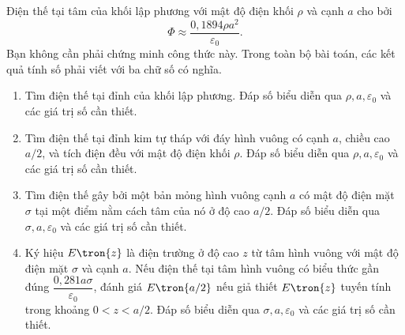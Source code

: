 \begin{vd}%
Điện thế tại tâm của khối lập phương với mật độ điện khối $\rho$ và cạnh $a$ cho bởi
$$\Phi  \approx \dfrac{{0,1894\rho {a^2}}}{{{\varepsilon_0}}}.$$
Bạn không cần phải chứng minh công thức này. Trong toàn bộ bài toán, các kết quả tính số phải viết với ba chữ số có nghĩa.
\begin{enumerate}[1)]
    \item Tìm điện thế tại đỉnh của khối lập phương. Đáp số biểu diễn qua $\rho ,a,{\varepsilon _0}$ và các giá trị số cần thiết.
    \item Tìm điện thế tại đỉnh kim tự tháp với đáy hình vuông có cạnh $a$, chiều cao $a/2$, và tích điện đều với mật độ điện khối $\rho$. Đáp số biểu diễn qua $\rho ,a,{\varepsilon _0}$ và các giá trị số cần thiết.
    \item Tìm điện thế gây bởi một bản mỏng hình vuông cạnh $a$ có mật độ điện mặt $\sigma$ tại một điểm nằm cách tâm của nó ở độ cao $a/2$. Đáp số biểu diễn qua $\sigma ,a,{\varepsilon _0}$ và các giá trị số cần thiết.
    \item Ký hiệu $E\tron{z}$ là điện trường ở độ cao $z$ từ tâm hình vuông với mật độ điện mặt $\sigma$ và cạnh $a$. Nếu điện thế tại tâm hình vuông có biểu thức gần đúng $\dfrac{{0,281a\sigma }}{{{\varepsilon _0}}}$, đánh giá $E\tron{a/2}$ nếu giả thiết $E\tron{z}$ tuyến tính trong khoảng $0<z<a/2$. Đáp số biểu diễn qua $\sigma ,a,{\varepsilon _0}$ và các giá trị số cần thiết.
\end{enumerate}
\end{vd}
